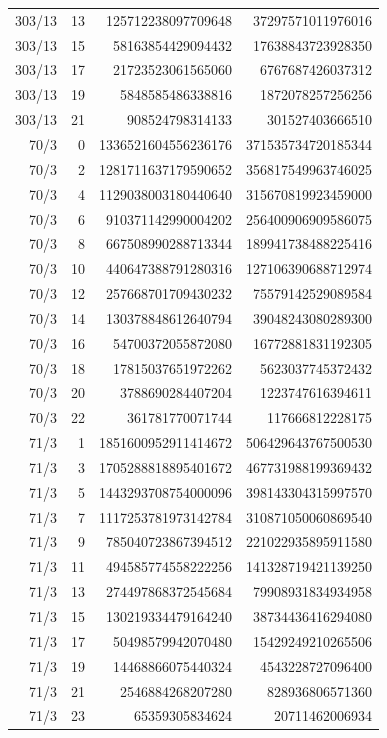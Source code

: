 \begin{longtable}{@{}rrrr@{}}
303/13 & 13 & 125712238097709648 & 37297571011976016\\
303/13 & 15 & 58163854429094432 & 17638843723928350\\
303/13 & 17 & 21723523061565060 & 6767687426037312\\
303/13 & 19 & 5848585486338816 & 1872078257256256\\
303/13 & 21 & 908524798314133 & 301527403666510\\
70/3 & 0 & 1336521604556236176 & 371535734720185344\\
70/3 & 2 & 1281711637179590652 & 356817549963746025\\
70/3 & 4 & 1129038003180440640 & 315670819923459000\\
70/3 & 6 & 910371142990004202 & 256400906909586075\\
70/3 & 8 & 667508990288713344 & 189941738488225416\\
70/3 & 10 & 440647388791280316 & 127106390688712974\\
70/3 & 12 & 257668701709430232 & 75579142529089584\\
70/3 & 14 & 130378848612640794 & 39048243080289300\\
70/3 & 16 & 54700372055872080 & 16772881831192305\\
70/3 & 18 & 17815037651972262 & 5623037745372432\\
70/3 & 20 & 3788690284407204 & 1223747616394611\\
70/3 & 22 & 361781770071744 & 117666812228175\\
71/3 & 1 & 1851600952911414672 & 506429643767500530\\
71/3 & 3 & 1705288818895401672 & 467731988199369432\\
71/3 & 5 & 1443293708754000096 & 398143304315997570\\
71/3 & 7 & 1117253781973142784 & 310871050060869540\\
71/3 & 9 & 785040723867394512 & 221022935895911580\\
71/3 & 11 & 494585774558222256 & 141328719421139250\\
71/3 & 13 & 274497868372545684 & 79908931834934958\\
71/3 & 15 & 130219334479164240 & 38734436416294080\\
71/3 & 17 & 50498579942070480 & 15429249210265506\\
71/3 & 19 & 14468866075440324 & 4543228727096400\\
71/3 & 21 & 2546884268207280 & 828936806571360\\
71/3 & 23 & 65359305834624 & 20711462006934\\

\end{longtable}
